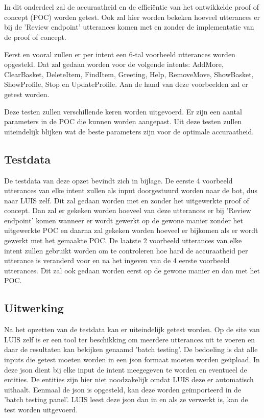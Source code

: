 \chapter{}
\label{ch:res}

In dit onderdeel zal de accuraatheid en de efficiëntie van het ontwikkelde proof of concept (POC) worden getest. Ook zal hier worden bekeken hoeveel utterances er bij de 'Review endpoint' utterances komen met en zonder de implementatie van de proof of concept.

Eerst en vooral zullen er per intent een 6-tal voorbeeld utterances worden opgesteld. Dat zal gedaan worden voor de volgende intents: AddMore, ClearBasket, DeleteItem, FindItem, Greeting, Help, RemoveMove, ShowBasket, ShowProfile, Stop en UpdateProfile. Aan de hand van deze voorbeelden zal er getest worden.

Deze testen zullen verschillende keren worden uitgevoerd. Er zijn een aantal parameters in de POC die kunnen worden aangepast. Uit deze testen zullen uiteindelijk blijken wat de beste parameters zijn voor de optimale accuraatheid.

\section{Testdata}
\label{sec:testdata}

De testdata van deze opzet bevindt zich in bijlage. De eerste 4 voorbeeld utterances van elke intent zullen als input doorgestuurd worden naar de bot, dus naar LUIS zelf. Dit zal gedaan worden met en zonder het uitgewerkte proof of concept. Dan zal er gekeken worden hoeveel van deze utterances er bij 'Review endpoint' komen wanneer er wordt gewerkt op de gewone manier zonder het uitgewerkte POC en daarna zal gekeken worden hoeveel er bijkomen als er wordt gewerkt met het gemaakte POC. De laatste 2 voorbeeld utterances van elke intent zullen gebruikt worden om te controleren hoe hard de accuraatheid per utterance is veranderd voor en na het ingeven van de 4 eerste voorbeeld utterances. Dit zal ook gedaan worden eerst op de gewone manier en dan met het POC.

\section{Uitwerking}
\label{sec:uitwerking}

Na het opzetten van de testdata kan er uiteindelijk getest worden. Op de site van LUIS zelf is er een tool ter beschikking om meerdere utterances uit te voeren en daar de resultaten kan bekijken genaamd 'batch testing'. De bedoeling is dat alle inputs die getest moeten worden in een json formaat moeten worden geüpload. In deze json dient bij elke input de intent meegegeven te worden en eventueel de entities. De entities zijn hier niet noodzakelijk omdat LUIS deze er automatisch uithaalt. Eenmaal de json is opgesteld, kan deze worden geïmporteerd in de 'batch testing panel'. LUIS leest deze json dan in en als ze verwerkt is, kan de test worden uitgevoerd.

